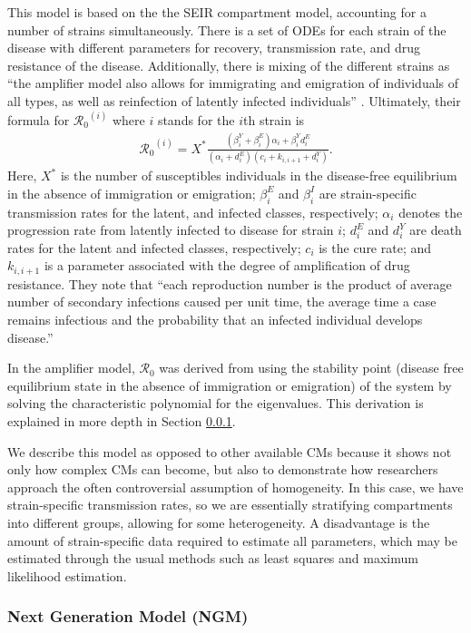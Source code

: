 \documentclass[12pt]{article}
\newcommand{\rr}{\ensuremath{\mathcal{R}_0}}
\begin{document}
This model is based on the the SEIR compartment model, accounting for a number of strains simultaneously.  There is a set of ODEs for each strain of the disease with different parameters for recovery, transmission rate, and drug resistance of the disease.  Additionally, there is mixing of the different strains as ``the amplifier model also allows for immigrating and emigration of individuals of all types, as well as reinfection of latently infected individuals'' \citep{blower2004}.  Ultimately, their formula for $\rr^{(i)}$ where $i$ stands for the $i$th strain is
\begin{align*}
\rr^{(i)} = X^* \frac{ ( \beta_i^Y + \beta_i^E)\alpha_i + \beta_i^Y d_i^E}{(\alpha_i + d_i^E)(c_i + k_{i,i+1} + d_i^Y)}.
\end{align*}
Here, $X^*$ is the number of susceptibles individuals in the disease-free equilibrium in the absence of immigration or emigration; $\beta_i^E$ and $\beta_i^I$ are strain-specific transmission rates for the latent, and infected classes, respectively; $\alpha_i$ denotes the progression rate from latently infected to disease for strain $i$; $d_i^E$ and $d_i^{Y}$ are death rates for the latent and infected classes, respectively; $c_i$ is the cure rate; and $k_{i, i+1}$ is a parameter associated with the degree of amplification of drug resistance.  They note that ``each reproduction number is the product of average number of secondary infections caused per unit time, the average time a case remains infectious and the probability that an infected individual develops disease.''

In the amplifier model, $\rr$ was derived from using the stability point (disease free equilibrium state in the absence of immigration or emigration) of the system by solving the characteristic polynomial for the eigenvalues.  This derivation is explained in more depth in Section \ref{sec:ngm}.

We describe this model as opposed to other available CMs because it shows not only how complex CMs can become, but also to demonstrate how researchers approach the often controversial assumption of homogeneity.  In this case, we have strain-specific transmission rates, so we are essentially stratifying compartments into different groups, allowing for some heterogeneity.  A disadvantage is the amount of strain-specific data required to estimate all parameters, which may be estimated through the usual methods such as least squares and maximum likelihood estimation.


\subsubsection{Next Generation Model (NGM)}
\label{sec:ngm}
\end{document}
